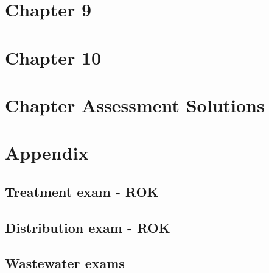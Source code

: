 \documentclass[11pt,fleqn]{book} %
\begin{document}
\part{Chapter 9}


\part{Chapter 10}


\part{Chapter Assessment Solutions}

%


\part{Appendix}

\appendix

\renewcommand{\chaptername}{Appendix A: } %

\vfill

\appendix
{} %


\chapter{Treatment exam - ROK}\label{appendix:Treatment Exam - ROK}


\chapter{Distribution exam - ROK}\label{appendix:Distribution Exam - ROK}


\chapter{Wastewater exams}\label{appendix:Wastewater Exams}

\end{document}
